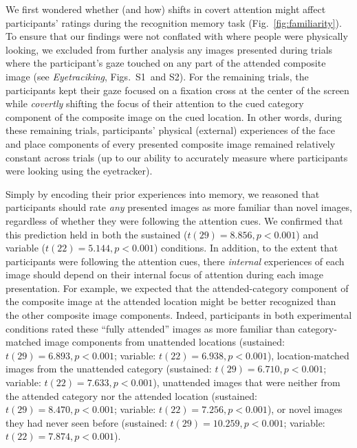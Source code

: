 \documentclass[english]{article}
\newcommand{\gazeLocations}{S1}
\newcommand{\excludedTrials}{S2}
\begin{document}
We first wondered whether (and how) shifts in covert attention might affect
participants' ratings during the recognition memory task
(Fig.~\ref{fig:familiarity}). To ensure that our findings were not conflated
with where people were physically looking, we excluded from further analysis
any images presented during trials where the participant's gaze touched on any
part of the attended composite image (see \textit{Eyetraciking},
Figs.~\gazeLocations~and \excludedTrials). For the remaining trials, the
participants kept their gaze focused on a fixation cross at the center of the
screen while \textit{covertly} shifting the focus of their attention to the
cued category component of the composite image on the cued location. In other
words, during these remaining trials, participants' physical (external)
experiences of the face and place components of every presented composite image
remained relatively constant across trials (up to our ability to accurately
measure where participants were looking using the eyetracker). 

Simply by encoding their prior experiences into memory, we reasoned that
participants should rate \textit{any} presented images as more familiar than
novel images, regardless of whether they were following the attention cues. We
confirmed that this prediction held in both the sustained ($t(29) = 8.856, p <
0.001$) and variable ($t(22) = 5.144, p < 0.001$) conditions. In addition, to
the extent that participants were following the attention cues, there
\textit{internal} experiences of each image should depend on their internal
focus of attention during each image presentation. For example, we expected
that the attended-category component of the composite image at the attended
location might be better recognized than the other composite image components.
Indeed, participants in both experimental conditions rated these ``fully
attended'' images as more familiar than category-matched image components from
unattended locations (sustained: $t(29) = 6.893, p < 0.001$; variable: $t(22) =
6.938, p < 0.001$), location-matched images from the unattended category
(sustained: $t(29) = 6.710, p < 0.001$; variable: $t(22) = 7.633, p < 0.001$),
unattended images that were neither from the attended category nor the attended
location (sustained: $t(29) = 8.470, p < 0.001$; variable: $t(22) = 7.256, p <
0.001$), or novel images they had never seen before (sustained: $t(29) =
10.259, p < 0.001$; variable: $t(22) = 7.874, p < 0.001$).
\end{document}
